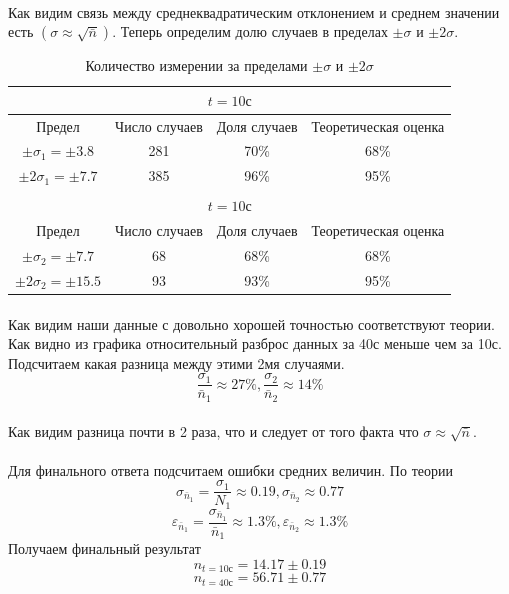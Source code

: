 \documentclass[a4paper, 12pt]{article}
\begin{document}
    \paragraph{}
    Как видим связь между среднеквадратическим отклонением и среднем значении есть $(\sigma \approx \sqrt{\bar{n}})$.
    Теперь определим долю случаев в пределах $\pm\sigma$ и $\pm2\sigma$.

    \begin{table}[H]
    \begin{center}
    \begin{tabular}{|c|c|c|c|}\hline
    \multicolumn{4}{|c|}{$t=10с$}\\\hline
    Предел & Число случаев & Доля случаев & Теоретическая оценка\\\hline
    $\pm \sigma_1 = \pm 3.8$ & 281 & 70\% & 68\% \\
    $\pm 2\sigma_1 = \pm 7.7$ & 385 & 96\% & 95\% \\\hline
    \multicolumn{4}{c}{}\\\hline
    \multicolumn{4}{|c|}{$t=10с$}\\\hline
    Предел & Число случаев & Доля случаев & Теоретическая оценка\\\hline
    $\pm \sigma_2 = \pm 7.7$ & 68 & 68\% & 68\% \\
    $\pm 2\sigma_2 = \pm 15.5$ & 93 & 93\% & 95\% \\\hline

    \end{tabular}
    \caption{Количество измерении за пределами $\pm\sigma$ и $\pm2\sigma$}
    \end{center}
    \end{table}

    \paragraph{}
    Как видим наши данные с довольно хорошей точностью соответствуют теории. Как видно из графика относительный разброс данных за 40с меньше чем за 10с. Подсчитаем какая разница между этими 2мя случаями.
    \[\frac{\sigma_1}{\bar{n}_1} \approx 27\%, \frac{\sigma_2}{\bar{n}_2} \approx 14\%\]
    \paragraph{}
    Как видим разница почти в 2 раза, что и следует от того факта что $\sigma \approx \sqrt{\bar{n}}$.
    \paragraph{}
    Для финального ответа подсчитаем ошибки средних величин. По теории
    \[\sigma_{\bar{n}_1} = \frac{\sigma_{1}}{N_1} \approx 0.19, \sigma_{\bar{n}_2} \approx 0.77\]
    \[\varepsilon_{\bar{n}_1} = \frac{\sigma_{\bar{n}_1}}{\bar{n}_1}\approx 1.3\%, \varepsilon_{\bar{n}_2}\approx 1.3\%\]
    Получаем финальный результат
    \[n_{t=10с}=14.17 \pm 0.19\]
    \[n_{t=40с}=56.71 \pm 0.77\]
\end{document}

